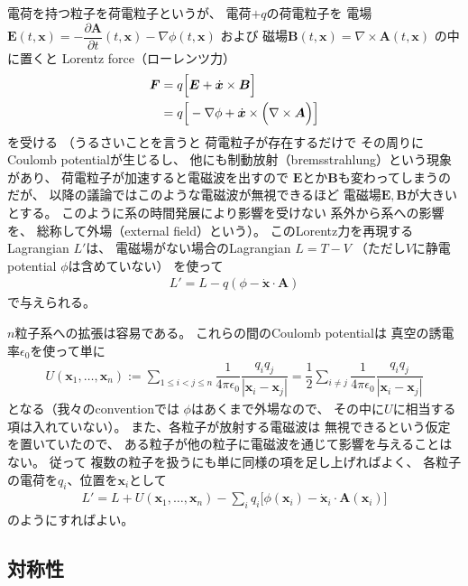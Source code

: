 電荷を持つ粒子を荷電粒子というが、
電荷$+q$の荷電粒子を
電場$\bm{E} (t, \bm{x})
= - \dfrac{\partial \bm{A}}{\partial t} (t, \bm{x})
- \nabla \phi (t, \bm{x})$
および
磁場$\bm{B} (t, \bm{x})
= \nabla \times \bm{A} (t, \bm{x})$
の中に置くと
Lorentz force（ローレンツ力）
\begin{align}
  \bm{F}
  &=
  q
  \Big[
    \bm{E}
  +
   \dot{\bm{x}}
    \times
    \bm{B}
  \Big]
\notag\\&=
  q
  \Big[
    - \nabla\phi
  +
   \dot{\bm{x}}
    \times
    \Big(
      \nabla \times \bm{A}
    \Big)
  \Big]
\end{align}
を受ける
（うるさいことを言うと
荷電粒子が存在するだけで
その周りにCoulomb potentialが生じるし、
他にも制動放射（bremsstrahlung）という現象があり、
荷電粒子が加速すると電磁波を出すので
$\bm{E}$とか$\bm{B}$も変わってしまうのだが、
以降の議論ではこのような電磁波が無視できるほど
電磁場$\bm{E}, \bm{B}$が大きいとする。
このように系の時間発展により影響を受けない
系外から系への影響を、
総称して外場（external field）という）。
このLorentz力を再現するLagrangian $L'$は、
電磁場がない場合のLagrangian $L = T - V$
（ただし$V$に静電potential $\phi$は含めていない）
を使って
\begin{align}
  L' = L - q(\phi - \dot{\bm{x}} \cdot \bm{A})
\end{align}
で与えられる。

$n$粒子系への拡張は容易である。
これらの間のCoulomb potentialは
真空の誘電率$\epsilon_0$を使って単に
\begin{align}
  U(\bm{x}_1, \dots, \bm{x}_n)
  :=
  \sum_{1 \le i < j \le n}
  \dfrac{1}{4 \pi \epsilon_0}
  \dfrac{q_i q_j}{|\bm{x}_i - \bm{x}_j|}
  =
  \dfrac{1}{2}
  \sum_{i \neq j}
  \dfrac{1}{4 \pi \epsilon_0}
  \dfrac{q_i q_j}{|\bm{x}_i - \bm{x}_j|}
\end{align}
となる（我々のconventionでは
$\phi$はあくまで外場なので、
その中に$U$に相当する項は入れていない）。
また、各粒子が放射する電磁波は
無視できるという仮定を置いていたので、
ある粒子が他の粒子に電磁波を通じて影響を与えることはない。
従って
複数の粒子を扱うにも単に同様の項を足し上げればよく、
各粒子の電荷を$q_i$、位置を$\bm{x}_i$として
\begin{align}
  L' = L
  +
  U(\bm{x}_1, \dots, \bm{x}_n)
  -
  \sum_i
  q_i\Big[
    \phi(\bm{x}_i)
  -
    \dot{\bm{x}}_i \cdot \bm{A}(\bm{x}_i)
  \Big]
\end{align}
のようにすればよい。

\subsection{対称性}

